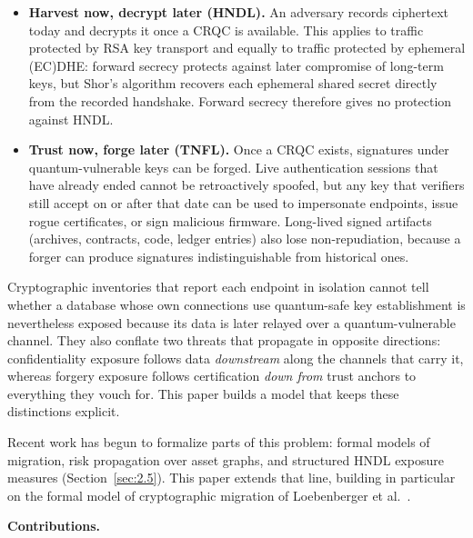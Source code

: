 \documentclass[conference]{IEEEtran}
\begin{document}
\begin{itemize}
\item \textbf{Harvest now, decrypt later (HNDL).} An adversary records ciphertext today and decrypts it once a CRQC is available. This applies to traffic protected by RSA key transport and equally to traffic protected by ephemeral (EC)DHE: forward secrecy protects against later compromise of long-term keys, but Shor's algorithm recovers each ephemeral shared secret directly from the recorded handshake. Forward secrecy therefore gives no protection against HNDL.
\item \textbf{Trust now, forge later (TNFL).} Once a CRQC exists, signatures under quantum-vulnerable keys can be forged. Live authentication sessions that have already ended cannot be retroactively spoofed, but any key that verifiers still accept on or after that date can be used to impersonate endpoints, issue rogue certificates, or sign malicious firmware. Long-lived signed artifacts (archives, contracts, code, ledger entries) also lose non-repudiation, because a forger can produce signatures indistinguishable from historical ones.
\end{itemize}

Cryptographic inventories that report each endpoint in isolation cannot tell whether a database whose own connections use quantum-safe key establishment is nevertheless exposed because its data is later relayed over a quantum-vulnerable channel. They also conflate two threats that propagate in opposite directions: confidentiality exposure follows data \emph{downstream} along the channels that carry it, whereas forgery exposure follows certification \emph{down from} trust anchors to everything they vouch for. This paper builds a model that keeps these distinctions explicit.

Recent work has begun to formalize parts of this problem: formal models of migration, risk propagation over asset graphs, and structured HNDL exposure measures (Section~\ref{sec:2.5}). This paper extends that line, building in particular on the formal model of cryptographic migration of Loebenberger et al.~\cite{loebenberger2024}.

\textbf{Contributions.}
\end{document}
